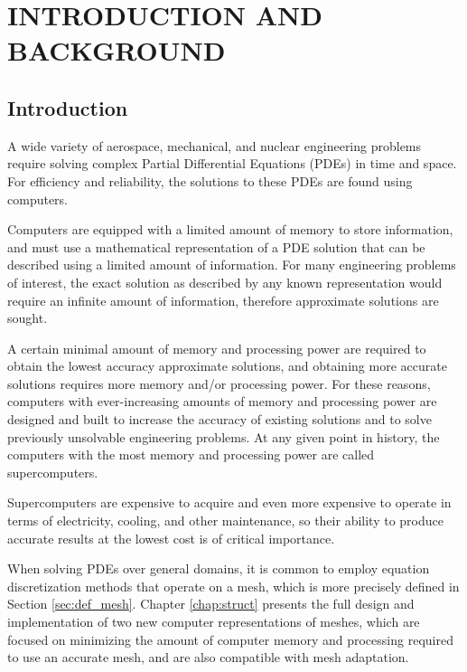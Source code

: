 
\chapter{INTRODUCTION AND BACKGROUND}
\label{chap:intro}

\section{Introduction}
\label{sec:intro}

A wide variety of aerospace, mechanical, and nuclear engineering
problems require solving complex Partial Differential
Equations (PDEs) in time and space.
For efficiency and reliability, the solutions to these PDEs are
found using computers.

Computers are equipped with a limited amount of memory to
store information, and must use a mathematical representation
of a PDE solution that can be described using
a limited amount of information.
For many engineering problems of interest, the exact solution
as described by any known representation would require an
infinite amount of information, therefore approximate
solutions are sought.

A certain minimal amount of memory and processing power
are required to obtain the lowest accuracy approximate
solutions, and obtaining more accurate solutions requires
more memory and/or processing power.
For these reasons, computers with ever-increasing amounts
of memory and processing power are designed and built to
increase the accuracy of existing solutions and
to solve previously unsolvable engineering problems.
At any given point in history, the computers with the
most memory and processing power are called supercomputers.

Supercomputers are expensive to acquire and even more
expensive to operate in terms of electricity, cooling, and other
maintenance, so their ability to
produce accurate results at the lowest cost
is of critical importance.

When solving PDEs over general domains, it is common to
employ equation discretization methods that operate on a mesh,
which is more precisely defined in Section \ref{sec:def_mesh}.
Chapter \ref{chap:struct} presents the full design
and implementation of two new computer representations
of meshes, which are focused on minimizing the amount
of computer memory and processing required to use
an accurate mesh, and are also compatible with mesh adaptation.

